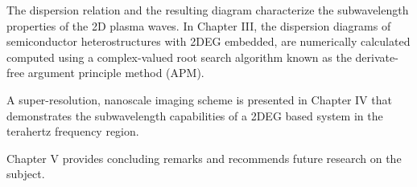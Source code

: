 The dispersion relation and the resulting diagram characterize the subwavelength properties of the 2D plasma waves. In Chapter III, the dispersion diagrams of semiconductor heterostructures with 2DEG embedded, are numerically calculated computed using a complex-valued root search algorithm known as the derivate-free argument principle method (APM).

A super-resolution, nanoscale imaging scheme is presented in Chapter IV that demonstrates the subwavelength capabilities of a 2DEG based system in the terahertz frequency region.

Chapter V provides concluding remarks and recommends future research on the subject.
